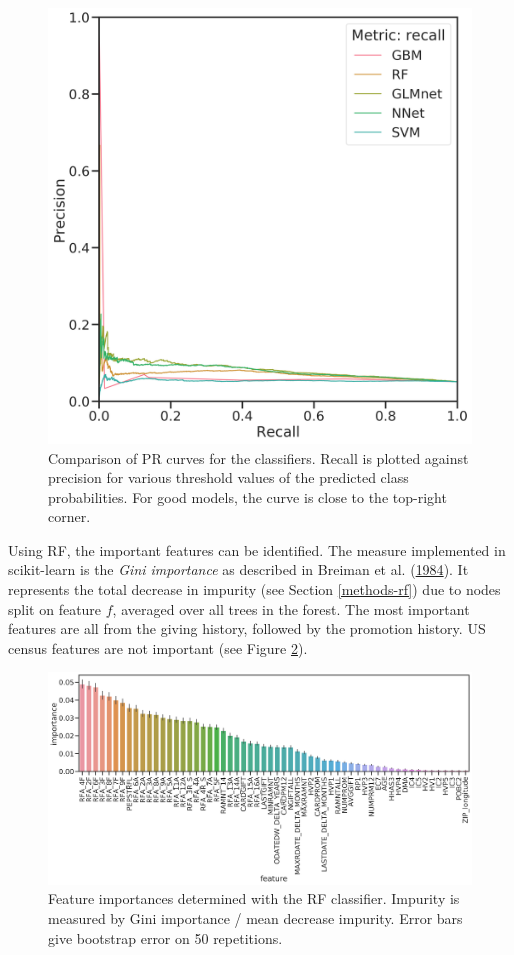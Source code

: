 \documentclass[
  11pt,
  a4paper,
  DIV=12,captions=tableheading,oneside,titlepage]{scrbook}
\begin{document}
\begin{figure}

{\centering \includegraphics[width=0.7\linewidth]{figures/learning/prec_rec_compared_refit_recall} 

}

\caption{Comparison of PR curves for the classifiers. Recall is plotted against precision for various threshold values of the predicted class probabilities. For good models, the curve is close to the top-right corner.}\label{fig:p-r-curve}
\end{figure}

Using RF, the important features can be identified. The measure implemented in scikit-learn is the \emph{Gini importance} as described in Breiman et al. (\protect\hyperlink{ref-breiman1984classification}{1984}). It represents the total decrease in impurity (see Section \ref{methods-rf}) due to nodes split on feature \(f\), averaged over all trees in the forest. The most important features are all from the giving history, followed by the promotion history. US census features are not important (see Figure \ref{fig:importances}).

\begin{figure}

{\centering \includegraphics[width=1\linewidth]{figures/learning/feature-importance-rf-classification} 

}

\caption{Feature importances determined with the RF classifier. Impurity is measured by Gini importance / mean decrease impurity. Error bars give bootstrap error on 50 repetitions.}\label{fig:importances}
\end{figure}
\end{document}

